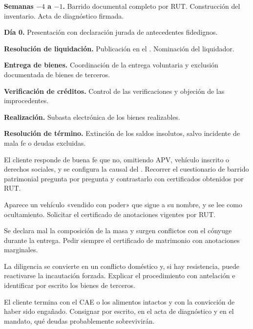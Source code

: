 \begin{checklist}
  \item \textbf{Semanas $-4$ a $-1$.} Barrido documental completo por RUT. Construcción
  del inventario. Acta de diagnóstico firmada.
  \item \textbf{Día 0.} Presentación con declaración jurada de antecedentes fidedignos.
  \item \textbf{Resolución de liquidación.} Publicación en el \boletin{}. Nominación del
  liquidador.
  \item \textbf{Entrega de bienes.} Coordinación de la entrega voluntaria y exclusión
  documentada de bienes de terceros.
  \item \textbf{Verificación de créditos.} Control de las verificaciones y objeción de
  las improcedentes.
  \item \textbf{Realización.} Subasta electrónica de los bienes realizables.
  \item \textbf{Resolución de término.} Extinción de los saldos insolutos, salvo
  incidente de mala fe o deudas excluidas.
\end{checklist}

\bloqueErrores

{El cliente responde de buena fe que no, omitiendo APV, vehículo inscrito o derechos
sociales, y se configura la causal del  .}
{Recorrer el cuestionario de barrido patrimonial pregunta por pregunta y contrastarlo con
certificados obtenidos por RUT.}

{Aparece un vehículo «vendido con poder» que sigue a su nombre, y se lee como
ocultamiento.}
{Solicitar el certificado de anotaciones vigentes por RUT.}

{Se declara mal la composición de la masa y surgen conflictos con el cónyuge durante la
entrega.}
{Pedir siempre el certificado de matrimonio con anotaciones marginales.}

{La diligencia se convierte en un conflicto doméstico y, si hay resistencia, puede
reactivarse la incautación forzada.}
{Explicar el procedimiento con antelación e identificar por escrito los bienes de
terceros.}

{El cliente termina con el CAE o los alimentos intactos y con la convicción de haber sido
engañado.}
{Consignar por escrito, en el acta de diagnóstico y en el mandato, qué deudas
probablemente sobrevivirán.}
